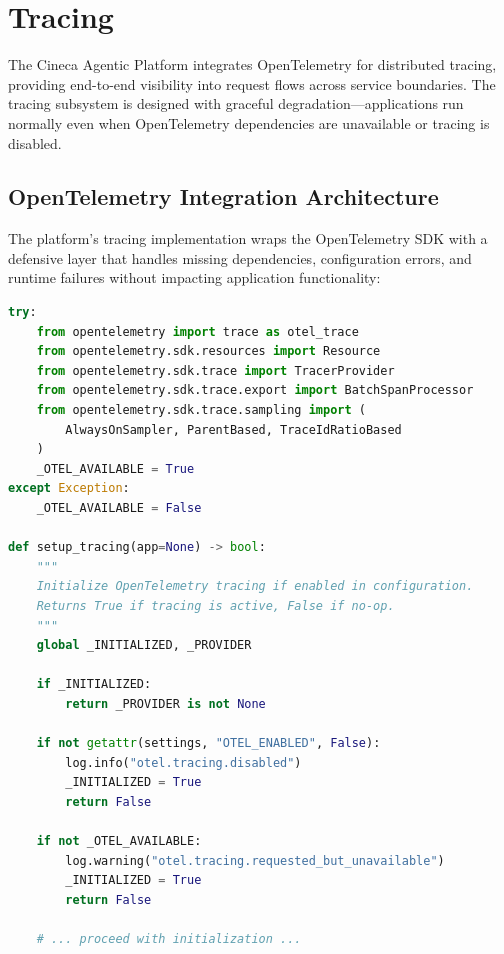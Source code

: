 
\section{Tracing}
\label{sec:tracing}

The Cineca Agentic Platform integrates OpenTelemetry for distributed tracing, providing end-to-end visibility into request flows across service boundaries. The tracing subsystem is designed with graceful degradation---applications run normally even when OpenTelemetry dependencies are unavailable or tracing is disabled.

\subsection{OpenTelemetry Integration Architecture}

The platform's tracing implementation wraps the OpenTelemetry SDK with a defensive layer that handles missing dependencies, configuration errors, and runtime failures without impacting application functionality:

\begin{lstlisting}[language=Python, caption={Defensive OpenTelemetry initialization (src/observability/tracing.py)}]
try:
    from opentelemetry import trace as otel_trace
    from opentelemetry.sdk.resources import Resource
    from opentelemetry.sdk.trace import TracerProvider
    from opentelemetry.sdk.trace.export import BatchSpanProcessor
    from opentelemetry.sdk.trace.sampling import (
        AlwaysOnSampler, ParentBased, TraceIdRatioBased
    )
    _OTEL_AVAILABLE = True
except Exception:
    _OTEL_AVAILABLE = False

def setup_tracing(app=None) -> bool:
    """
    Initialize OpenTelemetry tracing if enabled in configuration.
    Returns True if tracing is active, False if no-op.
    """
    global _INITIALIZED, _PROVIDER
    
    if _INITIALIZED:
        return _PROVIDER is not None
    
    if not getattr(settings, "OTEL_ENABLED", False):
        log.info("otel.tracing.disabled")
        _INITIALIZED = True
        return False
    
    if not _OTEL_AVAILABLE:
        log.warning("otel.tracing.requested_but_unavailable")
        _INITIALIZED = True
        return False
    
    # ... proceed with initialization ...
\end{lstlisting}

